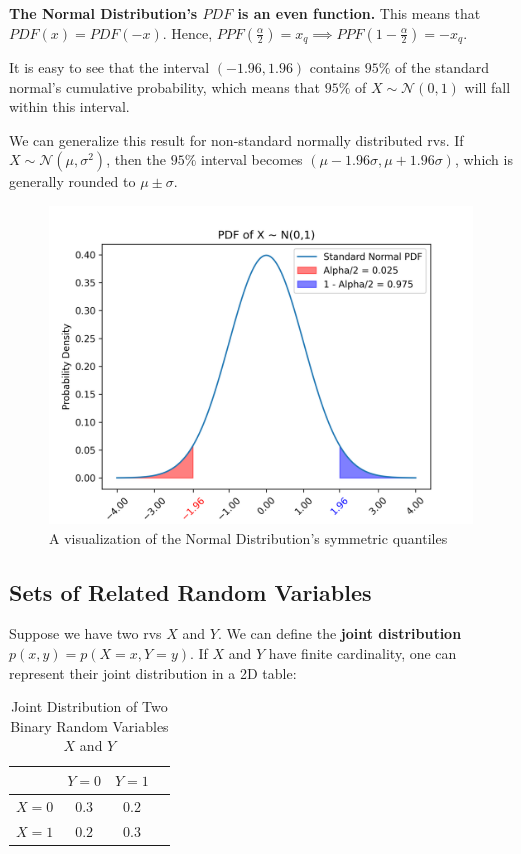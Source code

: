\documentclass{article}
\begin{document}
\textbf{The Normal Distribution's $PDF$ is an even function.} This means that $PDF(x) = PDF(-x)$. Hence, $PPF(\frac{\alpha}{2})  = x_q \implies PPF(1 - \frac{\alpha}{2}) = -x_q$.

It is easy to  see that the interval $(-1.96, 1.96)$ contains $95\%$ of the standard normal's cumulative probability, which means that $95\%$ of $X \sim \mathcal{N}(0, 1)$ will fall within this interval.

We can generalize this result for non-standard normally distributed rvs. If  $X \sim \mathcal{N}(\mu, \sigma^2)$, then the $95\%$ interval becomes $(\mu - 1.96\sigma, \mu + 1.96\sigma)$, which is generally rounded to $\mu \pm\sigma$.

\begin{figure}[h] 
	\centering
	\includegraphics[width=\linewidth]{images/standard_normal_pdf.png}
	\caption{A visualization of the Normal Distribution's symmetric quantiles}
	\label{fig:standard_normal_pdf}
\end{figure}

\subsection{Sets of Related Random Variables}

Suppose we have two rvs $X$ and $Y$. We can define the \textbf{joint distribution} $p(x,y) = p(X = x, Y= y)$. If  $X$ and $Y$ have finite cardinality, one can represent their joint distribution in a 2D table:

\begin{table}[H]
	\centering
	\caption{Joint Distribution of Two Binary Random Variables $X$ and $Y$}
	\begin{tabular}{|c|c|c|c|}
		\hline
		& $Y = 0$ & $Y =  1$  \\ \hline
		$X = 0$ & $0.3$  & $0.2$  \\ \hline
		$X = 1$ & $0.2$ & $0.3$ \\ \hline
	\end{tabular}
\end{table}
\end{document}
